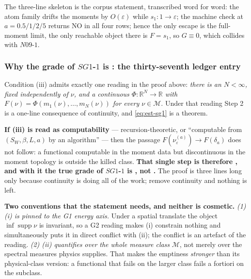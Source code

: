 \noindent The three-line skeleton is the corpus statement, transcribed word for word: the atom family
drifts the moments by $O(\varepsilon)$ while $s_1:1\to\varepsilon$; the machine check at
$a=0.5/1/2/5$ returns \textsf{NO} in all four rows; hence the only escape is the full-moment limit,
the only reachable object there is $F=s_1$, so $G\equiv0$, which collides with $N09$-$1$.

\subsubsection{Why the grade of \texorpdfstring{$SG1$-$1$}{SG1-1} is \texorpdfstring{\LC}{[C]}: the thirty-seventh ledger entry}
\label{sec:est-sg1-grade}

\noindent Condition (iii) admits exactly one reading in the proof above: \emph{there is an
$N<\infty$, fixed independently of $\nu$, and a continuous $\Phi:\mathbb R^N\to\mathbb R$ with
$F(\nu)=\Phi(m_1(\nu),\dots,m_N(\nu))$ for every $\nu\in\mathcal M$}. Under that reading Step 2 is a
one-line consequence of continuity, and \eqref{eq:est-sg1} is a theorem.

\smallskip
\noindent\textbf{If (iii) is read as computability} --- recursion-theoretic, or ``computable from
$(S_W,\beta,L,a)$ by an algorithm'' --- then the passage
$F(\nu_\varepsilon^{(a)})\to F(\delta_a)$ does not follow: a functional computable in the moment
data but discontinuous in the moment topology is outside the killed class. \textbf{That single step
is therefore \LC, and with it the true grade of $SG1$-$1$ is \LC, not \LT.} The proof is three lines
long only because continuity is doing all of the work; remove continuity and nothing is left.

\smallskip
\noindent\textbf{Two conventions that the statement needs, and neither is cosmetic.}
\emph{(1) (i) is pinned to the G1 energy axis.} Under a spatial translate the object
$\inf\operatorname{supp}\nu$ is invariant, so a G2 reading makes (i) constrain nothing and
simultaneously puts it in direct conflict with (ii); the conflict is an artefact of the reading.
\emph{(2) (ii) quantifies over the whole measure class} $\mathcal M$, not merely over the spectral
measures physics supplies. That makes the emptiness \emph{stronger} than its physical-class version:
a functional that fails on the larger class fails a fortiori on the subclass.

